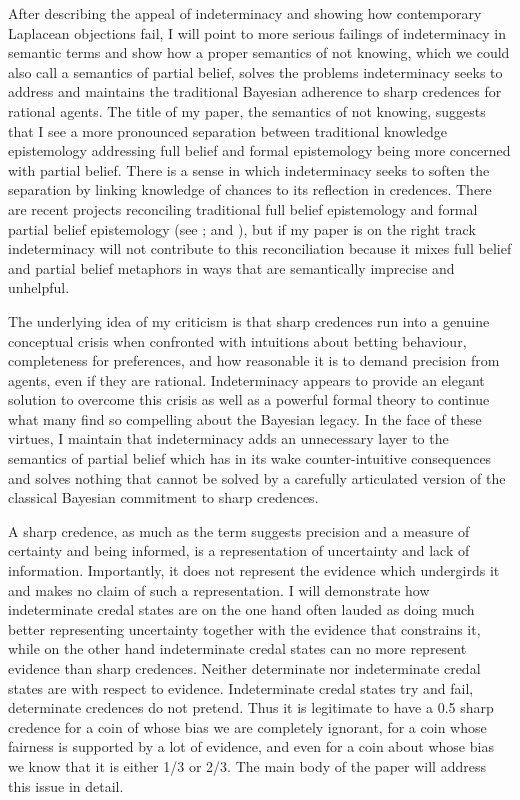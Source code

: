 \documentclass[11pt]{article}
\begin{document}
After describing the appeal of indeterminacy and showing how
contemporary Laplacean objections fail, I will point to more serious
failings of indeterminacy in semantic terms and show how a proper
semantics of not knowing, which we could also call a semantics of
partial belief, solves the problems indeterminacy seeks to address and
maintains the traditional Bayesian adherence to sharp credences for
rational agents. The title of my paper, the semantics of not knowing,
suggests that I see a more pronounced separation between traditional
knowledge epistemology addressing full belief and formal epistemology
being more concerned with partial belief. There is a sense in which
indeterminacy seeks to soften the separation by linking knowledge of
chances to its reflection in credences. There are recent projects
reconciling traditional full belief epistemology and formal partial
belief epistemology (see ; and
), but if my paper is on the right track
indeterminacy will not contribute to this reconciliation because it
mixes full belief and partial belief metaphors in ways that are
semantically imprecise and unhelpful.

The underlying idea of my criticism is that sharp credences run into a
genuine conceptual crisis when confronted with intuitions about
betting behaviour, completeness for preferences, and how reasonable it
is to demand precision from agents, even if they are rational.
Indeterminacy appears to provide an elegant solution to overcome this
crisis as well as a powerful formal theory to continue what many find
so compelling about the Bayesian legacy. In the face of these virtues,
I maintain that indeterminacy adds an unnecessary layer to the
semantics of partial belief which has in its wake counter-intuitive
consequences and solves nothing that cannot be solved by a carefully
articulated version of the classical Bayesian commitment to sharp
credences.

A sharp credence, as much as the term suggests precision and a measure
of certainty and being informed, is a representation of uncertainty
and lack of information. Importantly, it does not represent the
evidence which undergirds it and makes no claim of such a
representation. I will demonstrate how indeterminate credal states are
on the one hand often lauded as doing much better representing
uncertainty together with the evidence that constrains it, while on
the other hand indeterminate credal states can no more represent
evidence than sharp credences. Neither determinate nor indeterminate
credal states are  with respect to
evidence. Indeterminate credal states try and fail, determinate
credences do not pretend. Thus it is legitimate to have a 0.5 sharp
credence for a coin of whose bias we are completely ignorant, for a
coin whose fairness is supported by a lot of evidence, and even for a
coin about whose bias we know that it is either 1/3 or 2/3. The main
body of the paper will address this issue in detail.
\end{document}
